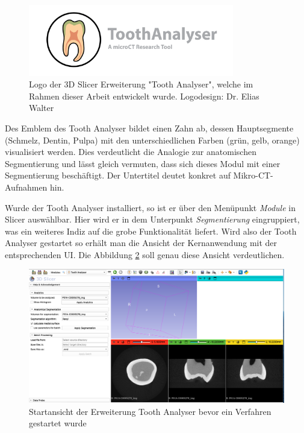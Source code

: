 \begin{figure}[h]
	\centering
	\includegraphics[width=0.8\textwidth]{img/SlicerToothAnalyser.png}
	\caption{Logo der 3D Slicer Erweiterung "Tooth Analyser", welche im Rahmen dieser
	Arbeit entwickelt wurde. Logodesign: Dr. Elias Walter}
	\label{fig:logo_tooth_analyser}
\end{figure}

Des Emblem des Tooth Analyser bildet einen Zahn ab, dessen Hauptsegmente (Schmelz,
Dentin, Pulpa) mit den unterschiedlichen Farben (grün, gelb, orange) visualisiert
werden. Dies verdeutlicht die Analogie zur anatomischen Segmentierung und lässt
gleich vermuten, dass sich dieses Modul mit einer Segmentierung beschäftigt. Der
Untertitel deutet konkret auf Mikro-\ac{CT}-Aufnahmen hin.

Wurde der Tooth Analyser installiert, so ist er über den Menüpunkt \textit{Module}
in Slicer auswählbar. Hier wird er in dem Unterpunkt \textit{Segmentierung} eingruppiert,
was ein weiteres Indiz auf die grobe Funktionalität liefert. Wird also der Tooth
Analyser gestartet so erhält man die Ansicht der Kernanwendung mit der entsprechenden
\ac{UI}. Die Abbildung \ref{fig:tooth_analyser_start_up} soll genau diese Ansicht
verdeutlichen.

\begin{figure}[h]
	\centering
	\includegraphics[scale=0.2, width=\textwidth]{img/toothAnalyserStarUp.png}
	\caption{Startansicht der Erweiterung Tooth Analyser bevor ein Verfahren
	gestartet wurde}
	\label{fig:tooth_analyser_start_up}
\end{figure}

